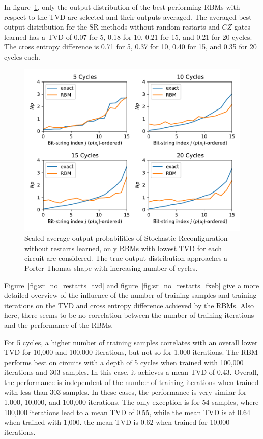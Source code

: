 In figure~\ref{fig:sr_no_restarts_bestPDF}, only the output distribution of the best performing RBMs with respect to the 
TVD are selected and their outputs averaged. The averaged best output distribution for the SR methods without 
random restarts and $CZ$ gates learned has a TVD of 0.07 for 5, 0.18 for 10, 0.21 for 15, and 0.21 for 20 
cycles. The cross entropy difference is 0.71 for 5, 0.37 for 10, 0.40 for 15, and 0.35 for 20 cycles each. 

\begin{figure}[H]
  \centering
  \includegraphics[width=\textwidth]{figures/results/SR-no-restarts-learned/avgBestPDF.pdf}
  \caption[Scaled Average Output Probabilities of Best Performing RBMs Trained with Stochastic Reconfiguration without Random Restarts and $CZ$ Gates Learned]{
    Scaled average output probabilities of Stochastic Reconfiguration without restarts learned, only RBMs with lowest
    TVD for each circuit are considered. The true 
    output distribution approaches a Porter-Thomas shape with increasing number of cycles.}
  \label{fig:sr_no_restarts_bestPDF}
\end{figure}

Figure~\ref{fig:sr_no_restarts_tvd} and figure~\ref{fig:sr_no_restarts_fxeb} give a more detailed overview of the influence of the 
number of training samples and training iterations on the TVD and cross entropy difference achieved by 
the RBMs. Also here, there seems to be no correlation between the number of training
iterations and the performance of the RBMs. 

For 5 cycles, a higher number of training samples 
correlates with an overall lower TVD for 10,000 and 100,000 iterations, but not so for 1,000 iterations. The RBM performs best on 
circuits with a depth of 5 cycles when trained with 100,000 iterations and 303 samples. In this case, 
it achieves a mean TVD of $0.43$. Overall, the performance is independent of the number of 
training iterations when trained with less than 303 samples. In these cases, the performance is very 
similar for 1,000, 10,000, and 100,000 iterations. The only exception is for 54 samples, where 100,000 iterations lead to a 
mean TVD of $0.55$, while the mean TVD is at $0.64$ when trained with 1,000. the mean TVD is $0.62$ when trained for 
10,000 iterations. 

